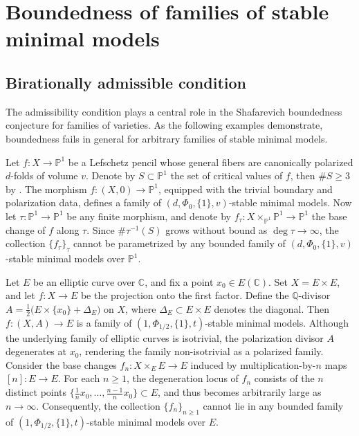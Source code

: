 \documentclass[11pt,letterpaper]{amsart}
\numberwithin{equation}{section}
\begin{document}
    \section{Boundedness of families of stable minimal models}
    \subsection{Birationally admissible condition}
    The admissibility condition plays a central role in the Shafarevich boundedness conjecture for families of varieties. As the following examples demonstrate, boundedness fails in general for arbitrary families of stable minimal models.   
    \begin{exmp}\label{exmp_1}
    	Let $f \colon X \to \mathbb{P}^1$ be a Lefschetz pencil whose general fibers are canonically polarized $d$-folds of volume $v$. Denote by $S \subset \mathbb{P}^1$ the set of critical values of $f$, then $\# S \geq 3$ by \cite{VZ2001}. The morphism $f \colon (X,0) \to \mathbb{P}^1$, equipped with the trivial boundary and polarization data, defines a family of $(d,\Phi_0,\{1\},v)$-stable minimal models. Now let $\tau \colon \mathbb{P}^1 \to \mathbb{P}^1$ be any finite morphism, and denote by $f_\tau \colon X \times_{\mathbb{P}^1} \mathbb{P}^1 \to \mathbb{P}^1$ the base change of $f$ along $\tau$. Since $\# \tau^{-1}(S)$ grows without bound as $\deg \tau \to \infty$, the collection $\{f_\tau\}_{\tau}$ cannot be parametrized by any bounded family of $(d,\Phi_0,\{1\},v)$-stable minimal models over $\mathbb{P}^1$.
    \end{exmp}   
    \begin{exmp}\label{exmp_2}
    	Let $E$ be an elliptic curve over $\mathbb{C}$, and fix a point $x_0 \in E(\mathbb{C})$. Set $X = E \times E$, and let $f \colon X \to E$ be the projection onto the first factor. Define the $\mathbb{Q}$-divisor $A = \frac{1}{2}\big(E \times \{x_0\} + \Delta_E\big)$ on $X$, where $\Delta_E \subset E \times E$ denotes the diagonal. Then $f \colon (X,A) \to E$ is a family of $(1,\Phi_{1/2},\{1\},t)$-stable minimal models. Although the underlying family of elliptic curves is isotrivial, the polarization divisor $A$ degenerates at $x_0$, rendering the family non-isotrivial as a polarized family. Consider the base changes $f_n \colon X \times_E E \to E$ induced by multiplication-by-$n$ maps $[n] \colon E \to E$. For each $n \geq 1$, the degeneration locus of $f_n$ consists of the $n$ distinct points $\big\{\frac{1}{n}x_0, \dots, \frac{n-1}{n}x_0\big\} \subset E$, and thus becomes arbitrarily large as $n \to \infty$. Consequently, the collection $\{f_n\}_{n \geq 1}$ cannot lie in any bounded family of $(1,\Phi_{1/2},\{1\},t)$-stable minimal models over $E$.
    \end{exmp}
\end{document}
